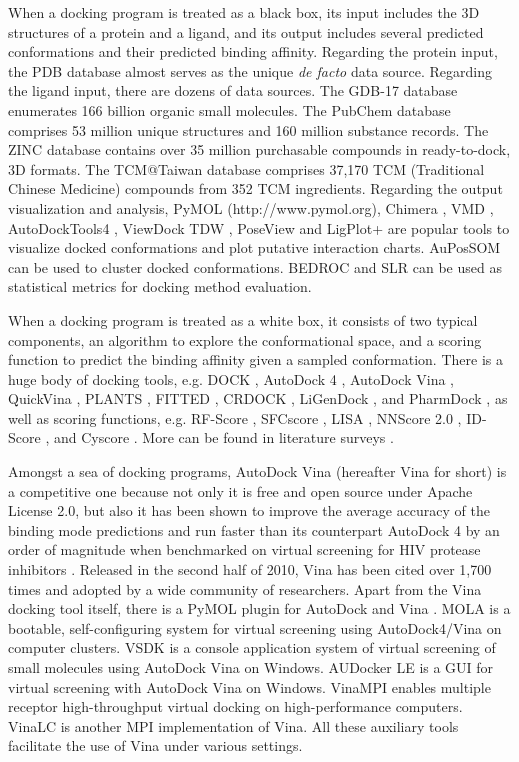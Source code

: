When a docking program is treated as a black box, its input includes the 3D structures of a protein and a ligand, and its output includes several predicted conformations and their predicted binding affinity. Regarding the protein input, the PDB database \citep{539,537} almost serves as the unique \textit{de facto} data source. Regarding the ligand input, there are dozens of data sources. The GDB-17 database \citep{1276} enumerates 166 billion organic small molecules. The PubChem database \citep{526} comprises 53 million unique structures and 160 million substance records. The ZINC database \citep{532,1178} contains over 35 million purchasable compounds in ready-to-dock, 3D formats. The TCM@Taiwan database \citep{528} comprises 37,170 TCM (Traditional Chinese Medicine) compounds from 352 TCM ingredients. Regarding the output visualization and analysis, PyMOL (http://www.pymol.org), Chimera \citep{1219}, VMD \citep{1220}, AutoDockTools4 \citep{596}, ViewDock TDW \citep{559}, PoseView \citep{748} and LigPlot+ \citep{951} are popular tools to visualize docked conformations and plot putative interaction charts. AuPosSOM \citep{598} can be used to cluster docked conformations. BEDROC \citep{490} and SLR \citep{489} can be used as statistical metrics for docking method evaluation.

When a docking program is treated as a white box, it consists of two typical components, an algorithm to explore the conformational space, and a scoring function to predict the binding affinity given a sampled conformation. There is a huge body of docking tools, e.g. DOCK \citep{1222,1445}, AutoDock 4 \citep{596}, AutoDock Vina \citep{595}, QuickVina \citep{1193}, PLANTS \citep{610,607,779}, FITTED \citep{602,603}, CRDOCK \citep{1200}, LiGenDock \citep{1495}, and PharmDock \citep{1376}, as well as scoring functions, e.g. RF-Score \citep{564,1370}, SFCscore \citep{581,1347}, LISA \citep{775}, NNScore 2.0 \citep{977}, ID-Score \cite{1305}, and Cyscore \cite{1372}. More can be found in literature surveys \citep{493,922}.

Amongst a sea of docking programs, AutoDock Vina \citep{595} (hereafter Vina for short) is a competitive one because not only it is free and open source under Apache License 2.0, but also it has been shown to improve the average accuracy of the binding mode predictions \citep{595} and run faster than its counterpart AutoDock 4 \citep{596} by an order of magnitude when benchmarked on virtual screening for HIV protease inhibitors \citep{556}. Released in the second half of 2010, Vina has been cited over 1,700 times and adopted by a wide community of researchers. Apart from the Vina docking tool itself, there is a PyMOL plugin for AutoDock and Vina \citep{609}. MOLA \citep{773} is a bootable, self-configuring system for virtual screening using AutoDock4/Vina on computer clusters. VSDK \citep{1268} is a console application system of virtual screening of small molecules using AutoDock Vina on Windows. AUDocker LE \citep{1250} is a GUI for virtual screening with AutoDock Vina on Windows. VinaMPI \citep{1329} enables multiple receptor high-throughput virtual docking on high-performance computers. VinaLC \citep{1562} is another MPI implementation of Vina. All these auxiliary tools facilitate the use of Vina under various settings.

